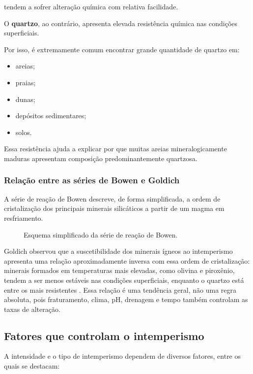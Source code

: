 tendem a sofrer alteração química com relativa facilidade.

O \textbf{quartzo}, ao contrário, apresenta elevada resistência química nas condições superficiais.

Por isso, é extremamente comum encontrar grande quantidade de quartzo em:

\begin{itemize}
    \item areias;
    \item praias;
    \item dunas;
    \item depósitos sedimentares;
    \item solos.
\end{itemize}

Essa resistência ajuda a explicar por que muitas areias mineralogicamente maduras apresentam composição predominantemente quartzosa.

\subsubsection{Relação entre as séries de Bowen e Goldich}

A série de reação de Bowen descreve, de forma simplificada, a ordem de cristalização dos principais minerais silicáticos a partir de um magma em resfriamento.

\begin{figure}[H]
  \centering
  \resizebox{0.92\linewidth}{!}{}
  \caption{Esquema simplificado da série de reação de Bowen.}
  \label{fig:bowen}
\end{figure}

Goldich observou que a suscetibilidade dos minerais ígneos ao intemperismo apresenta uma relação aproximadamente inversa com essa ordem de cristalização: minerais formados em temperaturas mais elevadas, como olivina e piroxênio, tendem a ser menos estáveis nas condições superficiais, enquanto o quartzo está entre os mais resistentes \parencite{goldich1938}. Essa relação é uma tendência geral, não uma regra absoluta, pois fraturamento, clima, pH, drenagem e tempo também controlam as taxas de alteração.

\subsection{Fatores que controlam o intemperismo}

A intensidade e o tipo de intemperismo dependem de diversos fatores, entre os quais se destacam:

